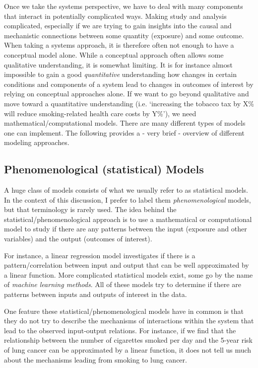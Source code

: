 \documentclass[]{book}
\theoremstyle{definition}
\theoremstyle{definition}
\theoremstyle{definition}
\theoremstyle{remark}
\begin{document}
Once we take the systems perspective, we have to deal with many
components that interact in potentially complicated ways. Making study
and analysis complicated, especially if we are trying to gain insights
into the causal and mechanistic connections between some quantity
(exposure) and some outcome. When taking a systems approach, it is
therefore often not enough to have a conceptual model alone. While a
conceptual approach often allows some qualitative understanding, it is
somewhat limiting. It is for instance almost impossible to gain a good
\emph{quantitative} understanding how changes in certain conditions and
components of a system lead to changes in outcomes of interest by
relying on conceptual approaches alone. If we want to go beyond
qualitative and move toward a quantitative understanding (i.e.
`increasing the tobacco tax by X\% will reduce smoking-related health
care costs by Y\%'), we need mathematical/computational models. There
are many different types of models one can implement. The following
provides a - very brief - overview of different modeling approaches.

\subsection{Phenomenological (statistical)
Models}\label{phenomenological-statistical-models}

A huge class of models consists of what we usually refer to as
statistical models. In the context of this discussion, I prefer to label
them \emph{phenomenological} models, but that terminology is rarely
used. The idea behind the statistical/phenomenological approach is to
use a mathematical or computational model to study if there are any
patterns between the input (exposure and other variables) and the output
(outcomes of interest).

For instance, a linear regression model investigates if there is a
pattern/correlation between input and output that can be well
approximated by a linear function. More complicated statistical models
exist, some go by the name of \emph{machine learning methods}. All of
these models try to determine if there are patterns between inputs and
outputs of interest in the data.

One feature these statistical/phenomenological models have in common is
that they do not try to describe the mechanisms of interactions within
the system that lead to the observed input-output relations. For
instance, if we find that the relationship between the number of
cigarettes smoked per day and the 5-year risk of lung cancer can be
approximated by a linear function, it does not tell us much about the
mechanisms leading from smoking to lung cancer.
\end{document}
